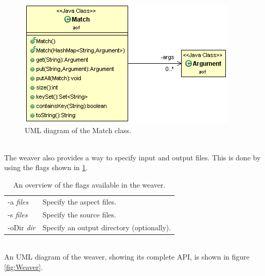 \documentclass[a4paper]{report}
\begin{document}
\begin{figure}[h!]
\centering
\includegraphics[scale=0.7]{images/AOF/Match.png}
\caption{UML diagram of the Match class.}
\label{fig:Match}
\end{figure}\\
The weaver also provides a way to specify input and output files. This is done by using the flags shown in \ref{tab:Flags}.\\
\begin{table}[h!]
\vspace{-10pt}
\centering
\begin{tabular}{l l}
-a \textit{files} & Specify the aspect files.\\ [0.5ex]
-s \textit{files} & Specify the source files.\\ [0.5ex]
-oDir \textit{dir} & Specify an output directory (optionally).\\
\end{tabular}
\caption{An overview of the flags available in the weaver.}
\label{tab:Flags}
\end{table}
\\
An UML diagram of the weaver, showing its complete API, is shown in figure \ref{fig:Weaver}.\\
\end{document}
